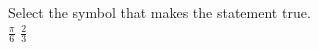 \documentclass{ximera}
\author{David Kish}
\begin{document}
\begin{exercise}
Select the symbol that makes the statement true.\\
$\frac{\pi}{6}$ \wordChoice{\choice[correct]{$<$}\choice{$>$}\choice{$=$}} $\frac{2}{3}$ 

\end{exercise}
\end{document}
